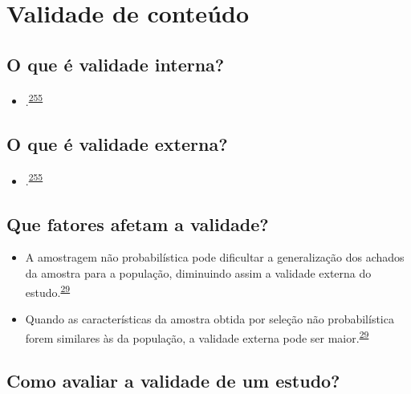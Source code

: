 \documentclass[
  a4paper,
]{book}
\providecommand{\tightlist}{%
  \setlength{\itemsep}{0pt}\setlength{\parskip}{0pt}}
\begin{document}
\hypertarget{validade-conteuxfado}{%
\section{Validade de conteúdo}\label{validade-conteuxfado}}

\hypertarget{o-que-uxe9-validade-interna}{%
\subsection{O que é validade interna?}\label{o-que-uxe9-validade-interna}}

\begin{itemize}
\tightlist
\item
  .\textsuperscript{\protect\hyperlink{ref-findley2021}{255}}
\end{itemize}

\hypertarget{o-que-uxe9-validade-externa}{%
\subsection{O que é validade externa?}\label{o-que-uxe9-validade-externa}}

\begin{itemize}
\tightlist
\item
  .\textsuperscript{\protect\hyperlink{ref-findley2021}{255}}
\end{itemize}

\hypertarget{que-fatores-afetam-a-validade}{%
\subsection{Que fatores afetam a validade?}\label{que-fatores-afetam-a-validade}}

\begin{itemize}
\item
  A amostragem não probabilística pode dificultar a generalização dos achados da amostra para a população, diminuindo assim a validade externa do estudo.\textsuperscript{\protect\hyperlink{ref-Banerjee2010}{29}}
\item
  Quando as características da amostra obtida por seleção não probabilística forem similares às da população, a validade externa pode ser maior.\textsuperscript{\protect\hyperlink{ref-Banerjee2010}{29}}
\end{itemize}

\hypertarget{como-avaliar-a-validade-de-um-estudo}{%
\subsection{Como avaliar a validade de um estudo?}\label{como-avaliar-a-validade-de-um-estudo}}
\end{document}
